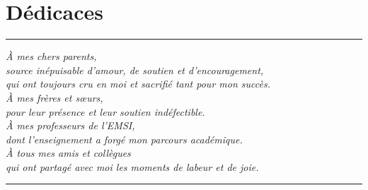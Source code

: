 \chapter*{Dédicaces}
\thispagestyle{fancy}

\begin{center}
  \textcolor{emsiRed}{\rule{0.5\linewidth}{1pt}}
\end{center}

\vspace{1cm}

\begin{flushright}
\itshape
À mes chers parents,\\
source inépuisable d'amour, de soutien et d'encouragement,\\
qui ont toujours cru en moi et sacrifié tant pour mon succès.\\[1cm]
À mes frères et sœurs,\\
pour leur présence et leur soutien indéfectible.\\[1cm]
À mes professeurs de l'EMSI,\\
dont l'enseignement a forgé mon parcours académique.\\[1cm]
À tous mes amis et collègues\\
qui ont partagé avec moi les moments de labeur et de joie.
\end{flushright}

\vspace{1cm}
\begin{center}
  \textcolor{emsiRed}{\rule{0.5\linewidth}{1pt}}
\end{center}
